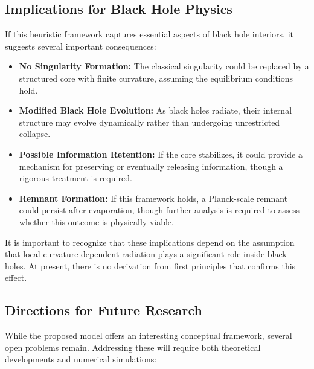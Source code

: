 \subsection{Implications for Black Hole Physics}
If this heuristic framework captures essential aspects of black hole interiors, it suggests several important consequences:
\begin{itemize}
    \item \textbf{No Singularity Formation:} The classical singularity could be replaced by a structured core with finite curvature, assuming the equilibrium conditions hold.
    \item \textbf{Modified Black Hole Evolution:} As black holes radiate, their internal structure may evolve dynamically rather than undergoing unrestricted collapse.
    \item \textbf{Possible Information Retention:} If the core stabilizes, it could provide a mechanism for preserving or eventually releasing information, though a rigorous treatment is required.
    \item \textbf{Remnant Formation:} If this framework holds, a Planck-scale remnant could persist after evaporation, though further analysis is required to assess whether this outcome is physically viable.
\end{itemize}

It is important to recognize that these implications depend on the assumption that local curvature-dependent radiation plays a significant role inside black holes. At present, there is no derivation from first principles that confirms this effect.

\subsection{Directions for Future Research}
While the proposed model offers an interesting conceptual framework, several open problems remain. Addressing these will require both theoretical developments and numerical simulations:

